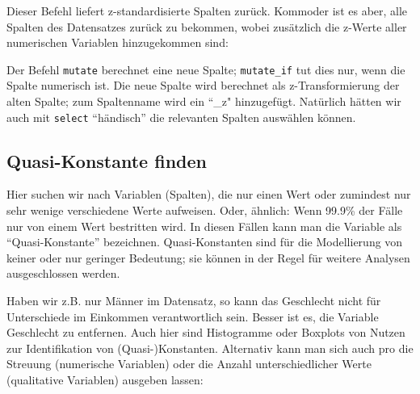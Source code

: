 \documentclass[12pt,ngerman,]{book}
\makeatletter
\newenvironment{Shaded}{\begin{snugshade}}{\end{snugshade}}
\newcommand{\KeywordTok}[1]{\textcolor[rgb]{0.13,0.29,0.53}{\textbf{#1}}}
\newcommand{\DataTypeTok}[1]{\textcolor[rgb]{0.13,0.29,0.53}{#1}}
\newcommand{\StringTok}[1]{\textcolor[rgb]{0.31,0.60,0.02}{#1}}
\newcommand{\CommentTok}[1]{\textcolor[rgb]{0.56,0.35,0.01}{\textit{#1}}}
\newcommand{\OtherTok}[1]{\textcolor[rgb]{0.56,0.35,0.01}{#1}}
\newcommand{\OperatorTok}[1]{\textcolor[rgb]{0.81,0.36,0.00}{\textbf{#1}}}
\newcommand{\NormalTok}[1]{#1}
\newenvironment{kframe}{%
\medskip{}
\setlength{\fboxsep}{.8em}
 \def\at@end@of@kframe{}%
 \ifinner\ifhmode%
  \def\at@end@of@kframe{\end{minipage}}%
  \begin{minipage}{\columnwidth}%
 \fi\fi%
 \def\FrameCommand##1{\hskip\@totalleftmargin \hskip-\fboxsep
 \colorbox{shadecolor}{##1}\hskip-\fboxsep
     \hskip-\linewidth \hskip-\@totalleftmargin \hskip\columnwidth}%
 \MakeFramed {\advance\hsize-\width
   \@totalleftmargin\z@ \linewidth\hsize
   \@setminipage}}%
 {\par\unskip\endMakeFramed%
 \at@end@of@kframe}
\renewenvironment{Shaded}{\begin{kframe}}{\end{kframe}}
\theoremstyle{definition}
\theoremstyle{definition}
\theoremstyle{remark}
\makeatother
\begin{document}
Dieser Befehl liefert z-standardisierte Spalten zurück. Kommoder ist es
aber, alle Spalten des Datensatzes zurück zu bekommen, wobei zusätzlich
die z-Werte aller numerischen Variablen hinzugekommen sind:

\begin{Shaded}
\end{Shaded}

Der Befehl \texttt{mutate} berechnet eine neue Spalte;
\texttt{mutate\_if} tut dies nur, wenn die Spalte numerisch ist. Die
neue Spalte wird berechnet als z-Transformierung der alten Spalte; zum
Spaltenname wird ein ``\_z" hinzugefügt. Natürlich hätten wir auch mit
\texttt{select} ``händisch'' die relevanten Spalten auswählen können.

\subsection{Quasi-Konstante finden}\label{quasi-konstante-finden}

Hier suchen wir nach Variablen (Spalten), die nur einen Wert oder
zumindest nur sehr wenige verschiedene Werte aufweisen. Oder, ähnlich:
Wenn 99.9\% der Fälle nur von einem Wert bestritten wird. In diesen
Fällen kann man die Variable als ``Quasi-Konstante'' bezeichnen.
Quasi-Konstanten sind für die Modellierung von keiner oder nur geringer
Bedeutung; sie können in der Regel für weitere Analysen ausgeschlossen
werden.

Haben wir z.B. nur Männer im Datensatz, so kann das Geschlecht nicht für
Unterschiede im Einkommen verantwortlich sein. Besser ist es, die
Variable Geschlecht zu entfernen. Auch hier sind Histogramme oder
Boxplots von Nutzen zur Identifikation von (Quasi-)Konstanten.
Alternativ kann man sich auch pro die Streuung (numerische Variablen)
oder die Anzahl unterschiedlicher Werte (qualitative Variablen) ausgeben
lassen:

\begin{Shaded}
\end{Shaded}
\end{document}
